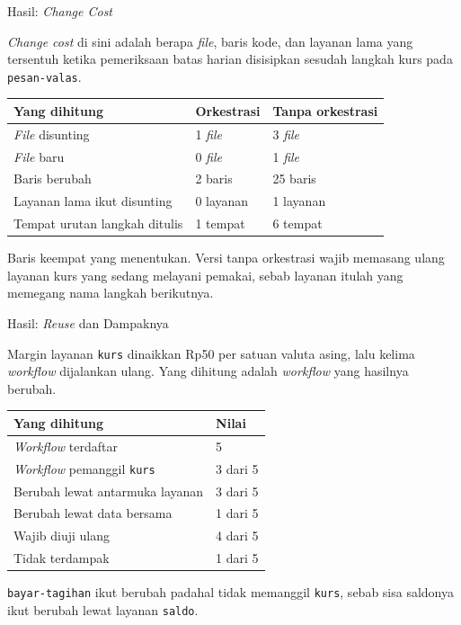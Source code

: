 \documentclass[aspectratio=169, table, 12pt]{beamer}
\begin{document}
\begin{frame}{{\Large Hasil: \textit{Change Cost}}}
  \vspace{10pt}
  \raggedright
  {\small \textit{Change cost} di sini adalah berapa \textit{file}, baris kode,
  dan layanan lama yang tersentuh ketika pemeriksaan batas harian disisipkan
  sesudah langkah kurs pada \texttt{pesan-valas}.}

  \vspace{4pt}
  \centering
  \small
  \begin{tabularx}{0.9\textwidth}{|X|l|l|}
    \hline
    \textbf{Yang dihitung} & \textbf{Orkestrasi} & \textbf{Tanpa orkestrasi} \\
    \hline
    \textit{File} disunting & 1 \textit{file} & 3 \textit{file} \\
    \hline
    \textit{File} baru & 0 \textit{file} & 1 \textit{file} \\
    \hline
    Baris berubah & 2 baris & 25 baris \\
    \hline
    Layanan lama ikut disunting & 0 layanan & 1 layanan \\
    \hline
    Tempat urutan langkah ditulis & 1 tempat & 6 tempat \\
    \hline
  \end{tabularx}

  \vspace{6pt}
  \raggedright
  {\small Baris keempat yang menentukan. Versi tanpa orkestrasi wajib memasang
  ulang layanan kurs yang sedang melayani pemakai, sebab layanan itulah yang
  memegang nama langkah berikutnya.}
\end{frame}

\begin{frame}{{\Large Hasil: \textit{Reuse} dan Dampaknya}}
  \vspace{10pt}
  \raggedright
  {\small Margin layanan \texttt{kurs} dinaikkan Rp50 per satuan valuta asing,
  lalu kelima \textit{workflow} dijalankan ulang. Yang dihitung adalah
  \textit{workflow} yang hasilnya berubah.}

  \vspace{4pt}
  \centering
  \small
  \begin{tabularx}{0.9\textwidth}{|X|l|}
    \hline
    \textbf{Yang dihitung} & \textbf{Nilai} \\
    \hline
    \textit{Workflow} terdaftar & 5 \\
    \hline
    \textit{Workflow} pemanggil \texttt{kurs} & 3 dari 5 \\
    \hline
    Berubah lewat antarmuka layanan & 3 dari 5 \\
    \hline
    Berubah lewat data bersama & 1 dari 5 \\
    \hline
    Wajib diuji ulang & 4 dari 5 \\
    \hline
    Tidak terdampak & 1 dari 5 \\
    \hline
  \end{tabularx}

  \vspace{6pt}
  \raggedright
  {\small \texttt{bayar-tagihan} ikut berubah padahal tidak memanggil
  \texttt{kurs}, sebab sisa saldonya ikut berubah lewat layanan \texttt{saldo}.}
\end{frame}
\end{document}
